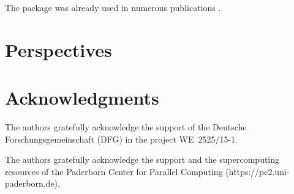 \documentclass{juliacon}
\begin{document}


The package was already used in numerous publications \cite{Friebertshaeuser2022PAMM,Friebertshaeuser2022AIMS,Partmann2023IJF,Partmann2024AAM,Partmann2024PAMM,Tornquist2022PAMM}.


\section{Perspectives}


\section{Acknowledgments}
The authors gratefully acknowledge the support of the Deutsche Forschungsgemeinschaft (DFG) in the project \mbox{WE~2525/15-1}.

The authors gratefully acknowledge the support and the supercomputing resources of the Paderborn Center for Parallel Computing (https://pc2.uni-paderborn.de).



\end{document}
